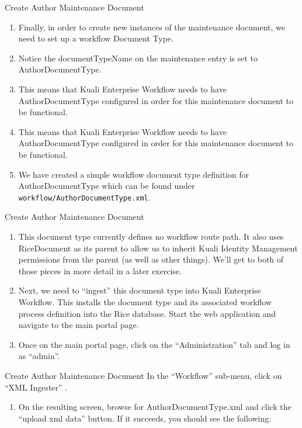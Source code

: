 \documentclass[xcolor=dvipsnames,14pt,professionalfonts]{beamer}
\begin{document}
\begin{frame}{Create Author Maintenance Document}
  \begin{enumerate}
  \item Finally, in order to create new instances of the maintenance document, we need to set up a workflow Document Type.
  \item Notice the documentTypeName on the maintenance entry is set to AuthorDocumentType.
  \item This means that Kuali Enterprise Workflow needs to have AuthorDocumentType configured in order for this maintenance document to be functional.
  \item This means that Kuali Enterprise Workflow needs to have AuthorDocumentType configured in order for this maintenance document to be functional.
  \item We have created a simple workflow document type definition for AuthorDocumentType which can be found under \texttt{workflow/AuthorDocumentType.xml}.
  \end{enumerate}
\end{frame}

\begin{frame}{Create Author Maintenance Document}
  \begin{enumerate}
  \item This document type currently defines no workflow route path.
    It also uses RiceDocument as its parent to allow us to inherit
    Kuali Identity Management permissions from the parent (as well as
    other things).  We’ll get to both of those pieces in more detail in a later exercise.
  \item Next, we need to “ingest” this document type into Kuali Enterprise Workflow.  This installs the document type and its associated workflow process definition into the Rice database.  Start the web application and navigate to the main portal page.
  \item Once on the main portal page, click on the “Administration” tab and log in as “admin”.
  \end{enumerate}
\end{frame}

\begin{frame}{Create Author Maintenance Document}
  In the “Workflow” sub-menu, click on “XML Ingester” .
  \begin{enumerate}
  \item On the resulting screen, browse for AuthorDocumentType.xml and click the “upload xml data” button.  If it succeeds, you should see the following:
  \end{enumerate}
\end{frame}
\end{document}
